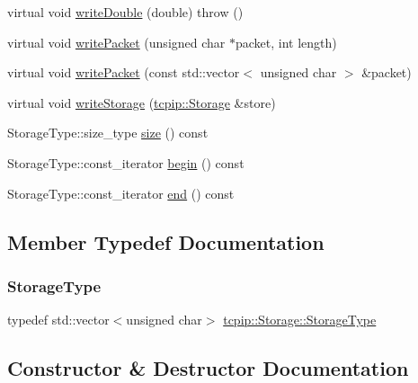 \begin{DoxyCompactItemize}
virtual void \hyperlink{classtcpip_1_1_storage_afb0fc2b3b7f32ac7cba3d885965e417e}{write\+Double} (double)  throw ()
\item 
virtual void \hyperlink{classtcpip_1_1_storage_ae5c91a96be8c103708273d3f79855fa8}{write\+Packet} (unsigned char $\ast$packet, int length)
\item 
virtual void \hyperlink{classtcpip_1_1_storage_abaf8bd3dd89102ea18f5cd85bc67b91c}{write\+Packet} (const std\+::vector$<$ unsigned char $>$ \&packet)
\item 
virtual void \hyperlink{classtcpip_1_1_storage_af574cbcecfb20c5525d579cd4a0bac8f}{write\+Storage} (\hyperlink{classtcpip_1_1_storage}{tcpip\+::\+Storage} \&store)
\item 
Storage\+Type\+::size\+\_\+type \hyperlink{classtcpip_1_1_storage_a69f9705be09f7e5be1a29f4d145f451a}{size} () const
\item 
Storage\+Type\+::const\+\_\+iterator \hyperlink{classtcpip_1_1_storage_a0e6208feb041731abbdb595085f29394}{begin} () const
\item 
Storage\+Type\+::const\+\_\+iterator \hyperlink{classtcpip_1_1_storage_a42a2fec87e26a5a90f56e3d8201559e1}{end} () const
\end{DoxyCompactItemize}


\subsection{Member Typedef Documentation}
\mbox{\label{classtcpip_1_1_storage_a087e7b1151a2642cb782b5a6bdc25576}} 
\subsubsection{\texorpdfstring{Storage\+Type}{StorageType}}
{\footnotesize\ttfamily typedef std\+::vector$<$unsigned char$>$ \hyperlink{classtcpip_1_1_storage_a087e7b1151a2642cb782b5a6bdc25576}{tcpip\+::\+Storage\+::\+Storage\+Type}}



\subsection{Constructor \& Destructor Documentation}
\mbox{\label{classtcpip_1_1_storage_a9e1914755462164da7d95a72aa7079a6}} 
